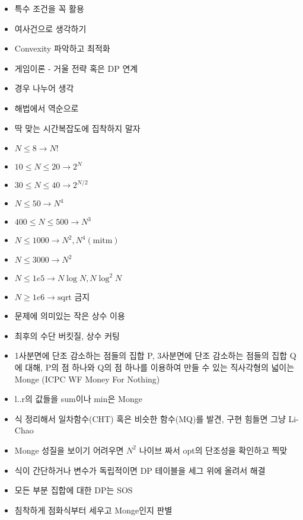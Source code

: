 \documentclass[landscape, 10pt, a4paper, oneside, twocolumn]{extarticle}
\begin{document}
\begin{itemize}
\item 특수 조건을 꼭 활용
\item 여사건으로 생각하기
\item Convexity 파악하고 최적화
\item 게임이론 - 거울 전략 혹은 DP 연계
\item 경우 나누어 생각
\item 해법에서 역순으로
\item 딱 맞는 시간복잡도에 집착하지 말자
\end{itemize}

\begin{itemize}
    \item $N \le 8 \rightarrow N!$
    \item $10 \le N \le 20 \rightarrow 2^N$
    \item $30 \le N \le 40 \rightarrow 2^{N/2}$
    \item $N \le 50 \rightarrow N^4$
    \item $400 \le N \le 500 \rightarrow N^3$
    \item $N \le 1000 \rightarrow N^2, N^4 (\text{mitm})$
    \item $N \le 3000 \rightarrow N^2$
    \item $N \le 1e5 \rightarrow N\log{N}, N\log^2{N}$
    \item $N \ge 1e6 \rightarrow \text{sqrt 금지}$
    \item 문제에 의미있는 작은 상수 이용
    \item 최후의 수단 버킷질, 상수 커팅
\end{itemize}

\begin{itemize}
    \item 1사분면에 단조 감소하는 점들의 집합 P, 3사분면에 단조 감소하는 점들의 집합 Q에 대해, P의 점 하나와 Q의 점 하나를 이용하여 만들 수 있는 직사각형의 넓이는 Monge (ICPC WF Money For Nothing)
    \item l..r의 값들을 sum이나 min은 Monge

    \item 식 정리해서 일차함수(CHT) 혹은 비슷한 함수(MQ)를 발견, 구현 힘들면 그냥 Li-Chao
    \item Monge 성질을 보이기 어려우면 $N^2$ 나이브 짜서 opt의 단조성을 확인하고 찍맞
    \item 식이 간단하거나 변수가 독립적이면 DP 테이블을 세그 위에 올려서 해결
    \item 모든 부분 집합에 대한 DP는 SOS
    \item 침착하게 점화식부터 세우고 Monge인지 판별
\end{itemize}
\end{document}
